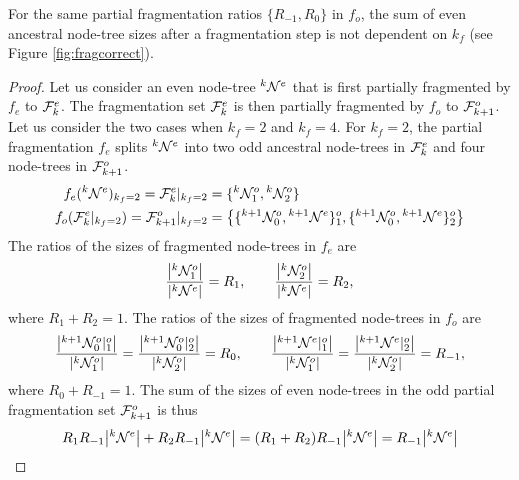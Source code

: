 \begin{lemma}\label{lem:sumevenkf}
  For the same partial fragmentation ratios $\{R_{-1}, R_0\}$ in $f_o$, the sum of even ancestral node-tree sizes after a fragmentation step is not dependent on $k_f$ (see Figure \ref{fig:fragcorrect}). 
\end{lemma}
\begin{proof}
  Let us consider an even node-tree ${}^{k}\mathcal{N}^e$ that is first partially fragmented by $f_e$ to $\mathcal{F}^e_k$. The fragmentation set $\mathcal{F}^e_k$ is then partially fragmented by $f_o$ to $\mathcal{F}_{k+1}^o$. Let us consider the two cases when $k_f=2$ and $k_f=4$. For $k_f=2$, the partial fragmentation $f_e$ splits ${}^{k}\mathcal{N}^e$ into two odd ancestral node-trees in $\mathcal{F}^e_k$ and four node-trees in $\mathcal{F}_{k+1}^o$.
  \begin{align*}
     f_e({}^{k}\mathcal{N}^e)_{k_f = 2} 
    = \mathcal{F}^e_{k}|_{k_f = 2}     
    &= \{ {}^{k} \mathcal{N}^{o}_1, {}^{k} \mathcal{N}^{o}_2\} \\
     f_o(\mathcal{F}^e_{k}|_{k_f = 2})   
    = \mathcal{F}^o_{k+1}|_{k_f = 2}   
    &= \left\{ \{{}^{k+1}\mathcal{N}^{o}_{0}, {}^{k+1}\mathcal{N}^{e}\}^o_1 , \{{}^{k+1}\mathcal{N}^{o}_{0}, {}^{k+1}\mathcal{N}^{e} \}^o_2 \right\} 
  \end{align*}
  The ratios of the sizes of fragmented node-trees in $f_e$ are
  \begin{equation*}
    \frac{\abs{{}^{k} \mathcal{N}^{o}_1}}{\abs{{}^{k}\mathcal{N}^e}} = R_1, \hspace{2em}
    \frac{\abs{{}^{k} \mathcal{N}^{o}_2}}{\abs{{}^{k}\mathcal{N}^e}} = R_2, 
  \end{equation*}
  where $ R_1 + R_2 = 1$. The ratios of the sizes of fragmented node-trees in $f_o$ are
  \begin{equation*}
    \frac{\abs{{}^{k+1}\mathcal{N}^{o}_0|^o_1}}{\abs{{}^{k} \mathcal{N}^{o}_1}} = 
    \frac{\abs{{}^{k+1}\mathcal{N}^{o}_0|^o_2}}{\abs{{}^{k} \mathcal{N}^{o}_2}} = R_0, \hspace{2em}
    \frac{\abs{{}^{k+1}\mathcal{N}^{e}  |^o_1}}{\abs{{}^{k} \mathcal{N}^{o}_1}} = 
    \frac{\abs{{}^{k+1}\mathcal{N}^{e}  |^o_2}}{\abs{{}^{k} \mathcal{N}^{o}_2}} = R_{-1},  
  \end{equation*}
  where $R_0 + R_{-1} = 1$. The sum of the sizes of even node-trees in the odd partial fragmentation set $\mathcal{F}^o_{k+1}$ is thus
  \begin{equation*}
    R_1 R_{-1} \abs{{}^{k}\mathcal{N}^e} + R_2 R_{-1} \abs{{}^{k}\mathcal{N}^e} = (R_1 + R_2) R_{-1} \abs{{}^{k}\mathcal{N}^e} = R_{-1} \abs{{}^{k}\mathcal{N}^e}
  \end{equation*}


\end{proof}

